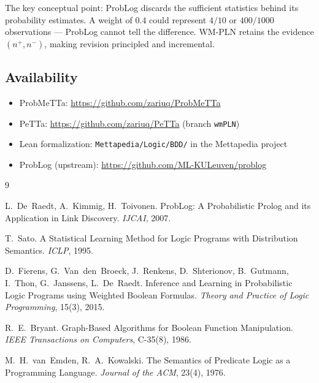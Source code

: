 \documentclass[11pt,a4paper]{article}
\theoremstyle{definition}
\begin{document}
The key conceptual point: ProbLog discards the sufficient statistics
behind its probability estimates. A weight of $0.4$ could represent
$4/10$ or $400/1000$ observations --- ProbLog cannot tell the difference.
WM-PLN retains the evidence $(n^+, n^-)$, making revision principled
and incremental.

\subsection*{Availability}

\begin{itemize}
\item ProbMeTTa: \url{https://github.com/zariuq/ProbMeTTa}
\item PeTTa: \url{https://github.com/zariuq/PeTTa} (branch \texttt{wmPLN})
\item Lean formalization: \texttt{Mettapedia/Logic/BDD/} in the Mettapedia project
\item ProbLog (upstream): \url{https://github.com/ML-KULeuven/problog}
\end{itemize}

\begin{thebibliography}{9}

L.~De~Raedt, A.~Kimmig, H.~Toivonen.
\newblock ProbLog: A Probabilistic Prolog and its Application in Link Discovery.
\newblock \emph{IJCAI}, 2007.

T.~Sato.
\newblock A Statistical Learning Method for Logic Programs with Distribution Semantics.
\newblock \emph{ICLP}, 1995.

D.~Fierens, G.~Van~den~Broeck, J.~Renkens, D.~Shterionov, B.~Gutmann,
I.~Thon, G.~Janssens, L.~De~Raedt.
\newblock Inference and Learning in Probabilistic Logic Programs using
Weighted Boolean Formulas.
\newblock \emph{Theory and Practice of Logic Programming}, 15(3), 2015.

R.~E.~Bryant.
\newblock Graph-Based Algorithms for Boolean Function Manipulation.
\newblock \emph{IEEE Transactions on Computers}, C-35(8), 1986.

M.~H.~van~Emden, R.~A.~Kowalski.
\newblock The Semantics of Predicate Logic as a Programming Language.
\newblock \emph{Journal of the ACM}, 23(4), 1976.

\end{thebibliography}
\end{document}
